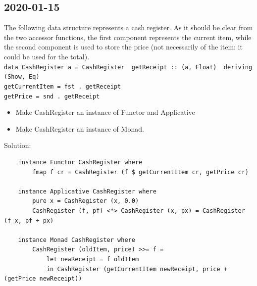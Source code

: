 \subsection{2020-01-15}
The following data structure represents a cash register. As it should be clear from the two accessor
functions, the first component represents the current item, while the second component is used to store
the price (not necessarily of the item: it could be used for the total). \\
\texttt{data CashRegister a = CashRegister { getReceipt :: (a, Float) } deriving (Show, Eq)} \\
\texttt{getCurrentItem = fst . getReceipt} \\
\texttt{getPrice = snd . getReceipt} \\
\begin{itemize}
    \item Make CashRegister an instance of Functor and Applicative
    \item Make CashRegister an instance of Monad.
\end{itemize}
Solution:
\begin{lstlisting}
    instance Functor CashRegister where
        fmap f cr = CashRegister (f $ getCurrentItem cr, getPrice cr)
    
    instance Applicative CashRegister where
        pure x = CashRegister (x, 0.0)
        CashRegister (f, pf) <*> CashRegister (x, px) = CashRegister (f x, pf + px)
    
    instance Monad CashRegister where
        CashRegister (oldItem, price) >>= f =
            let newReceipt = f oldItem
            in CashRegister (getCurrentItem newReceipt, price + (getPrice newReceipt))
\end{lstlisting}






